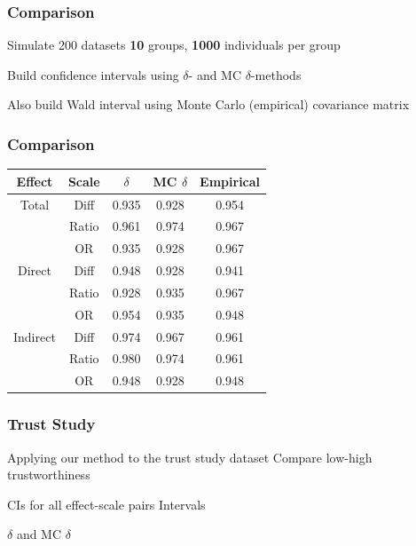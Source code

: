 \documentclass[14pt]{beamer}
\begin{document}
\begin{frame}
    \frametitle{Comparison}
    \begin{outline}
        \1 Simulate 200 datasets
            \2 \textbf{10} groups, \textbf{1000} individuals per group \newline

        \1 Build confidence intervals using $\delta$- and MC $\delta$-methods \newline

        \1 Also build Wald interval using Monte Carlo (empirical) covariance matrix

        \end{outline}
\end{frame}



\begin{frame}
    \frametitle{Comparison}
    \begin{table}[h!]
        \centering
        \begin{tabular}{|cc|ccc|}
            \hline
            Effect & Scale & $\delta$ & MC $\delta$ & Empirical\\
            \hline
            Total & Diff & 0.935 & 0.928 & 0.954 \\
            & Ratio & 0.961 & 0.974 & 0.967 \\
            & OR & 0.935 & 0.928 & 0.967 \\ 
            \hline
            Direct & Diff & 0.948 & 0.928 & 0.941 \\
            & Ratio & 0.928 & 0.935 & 0.967 \\
            & OR & 0.954 & 0.935 & 0.948 \\
            \hline
            Indirect & Diff & 0.974 & 0.967 & 0.961 \\
            & Ratio & 0.980 & 0.974 & 0.961 \\
            & OR & 0.948 & 0.928 & 0.948 \\
            \hline
        \end{tabular}
    \end{table}
\end{frame}



\begin{frame}
    \frametitle{Trust Study}
    \begin{outline}
        \1 Applying our method to the trust study dataset
            \2 Compare low-high trustworthiness \newline

        \1 CIs for all effect-scale pairs
             Intervals \newline

        \1 $\delta$ and MC $\delta$
    \end{outline}
\end{frame}
\end{document}
